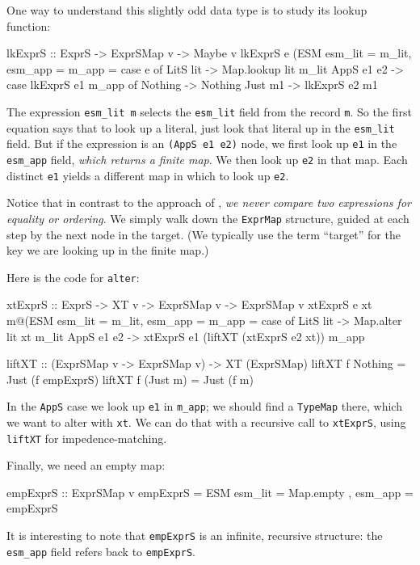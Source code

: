 \documentclass[format=sigplan]{acmart}
\theoremstyle{theorem}
\theoremstyle{definition}
\theoremstyle{remark}
\begin{document}
One way to understand this slightly odd data type is to study its lookup function:
\begin{code}
  lkExprS :: ExprS -> ExprSMap v -> Maybe v
  lkExprS e (ESM { esm_lit = m_lit, esm_app = m_app }
    = case e of
       LitS lit   -> Map.lookup lit m_lit
       AppS e1 e2 -> case lkExprS e1 m_app of
                       Nothing -> Nothing
                       Just m1 -> lkExprS e2 m1
\end{code}
The expression \lstinline{esm_lit m} selects the \lstinline{esm_lit} field from the record \lstinline{m}.  So the first
equation says that to look up a literal, just look that literal up in the \lstinline{esm_lit} field.
But if the expression is an \lstinline{(AppS e1 e2)} node, we first look up \lstinline{e1}
in the \lstinline{esm_app} field, \emph{which returns a finite map}.  We then look up \lstinline{e2}
in that map.  Each distinct \lstinline{e1} yields a different map in which to look up \lstinline{e2}.

Notice that in contrast to the approach of , \emph{we never compare two expressions
for equality or ordering}.  We simply walk down the \lstinline{ExprMap} structure, guided
at each step by the next node in the target.  (We typically use the term ``target'' for the
key we are looking up in the finite map.)

Here is the code for \lstinline{alter}:
\begin{code}
  xtExprS  :: ExprS -> XT v -> ExprSMap v -> ExprSMap v
  xtExprS e xt m@(ESM { esm_lit = m_lit, esm_app = m_app }
    = case of
        LitS lit   -> Map.alter lit xt m_lit
        AppS e1 e2 -> xtExprS e1 (liftXT (xtExprS e2 xt)) m_app

  liftXT :: (ExprSMap v -> ExprSMap v) -> XT (ExprSMap)
  liftXT f Nothing  = Just (f empExprS)
  liftXT f (Just m) = Just (f m)
\end{code}
In the \lstinline{AppS} case we look up \lstinline{e1} in \lstinline{m_app};
we should find a \lstinline{TypeMap} there, which we want to alter with \lstinline{xt}.
We can do that with a recursive call to \lstinline{xtExprS}, using \lstinline{liftXT}
for impedence-matching.

Finally, we need an empty map:
\begin{code}
  empExprS :: ExprSMap v
  empExprS = ESM { esm_lit = Map.empty
                 , esm_app = empExprS }
\end{code}
It is interesting to note that \lstinline{empExprS} is an infinite, recursive structure:
the \lstinline{esm_app} field refers back to \lstinline{empExprS}.
\end{document}

